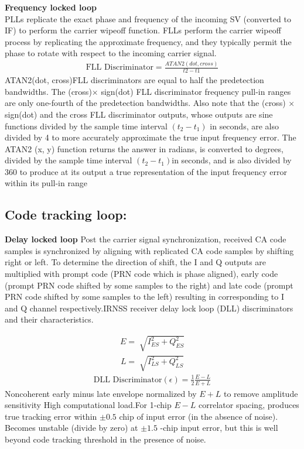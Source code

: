 \textbf{Frequency locked loop}\\
PLLs replicate the exact phase and frequency of the incoming SV (converted to IF) to perform the carrier wipeoff function. FLLs perform the carrier wipeoff process by replicating the approximate frequency, and they typically permit the phase to rotate with respect to the incoming carrier signal.
\begin{align}
\text{FLL Discriminator} =\frac{ATAN2(dot,cross)}{t2-t1}
\end{align}
ATAN2(dot, cross)FLL discriminators are equal to half the predetection bandwidths. The (cross)$\times$ sign(dot) FLL discriminator frequency pull-in ranges are only one-fourth of the predetection bandwidths. Also note that the (cross) $\times$ sign(dot) and the cross FLL discriminator outputs, whose outputs are sine functions divided by the sample time interval $(t_2 -t _1)$ in seconds, are also divided by 4 to more accurately approximate the true input frequency error. The ATAN2 (x, y) function returns the answer in radians, is converted to degrees, divided by the sample time interval $(t_2 - t_1)$in seconds,
and is also divided by 360 to produce at its output a true representation of the input
frequency error within its pull-in range
\subsection{Code tracking loop:}
\textbf{Delay locked loop}
Post the carrier signal synchronization, received CA code samples is synchronized by aligning with replicated CA code samples by shifting right or left. To determine the direction of shift, the I and Q outputs are multiplied with prompt code (PRN code which is phase aligned), early code (prompt PRN code shifted by some samples to the right) and late code (prompt PRN code shifted by some samples to the left) resulting in corresponding to I and Q channel respectively.IRNSS receiver delay lock loop (DLL) discriminators and their characteristics.

 \begin{align}
 E=\sqrt[]{I_{ES}^2+Q_{ES}^2}
 \end{align}
 \begin{align}
 L=\sqrt[]{I_{LS}^2+Q_{LS}^2}
 \end{align}
\begin{align}
\text{DLL Discriminator} (\epsilon)=\frac{1}{2}\frac{E-L}{E+L}
\end{align}
Noncoherent early minus late envelope normalized by $E + L$ to remove amplitude sensitivity High computational load.For  1-chip $E - L$ correlator spacing, produces true tracking error within $\pm 0.5$  chip of input error (in the absence of noise).
Becomes unstable (divide by zero) at $\pm 1.5$ -chip input error, but this is well beyond code tracking threshold in the presence of noise.
